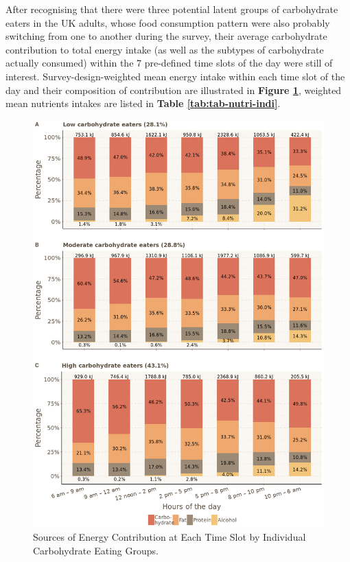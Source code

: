 After recognising that there were three potential latent groups of carbohydrate eaters in the UK adults, whose food consumption pattern were also probably switching from one to another during the survey, their average carbohydrate contribution to total energy intake (as well as the subtypes of carbohydrate actually consumed) within the 7 pre-defined time slots of the day were still of interest. Survey-design-weighted mean energy intake within each time slot of the day and their composition of contribution are illustrated in \textbf{Figure \ref{fig:energysourcesCB}}, weighted mean nutrients intakes are listed in \textbf{Table \ref{tab:tab-nutri-indi}}.

\begin{figure}[H]
	\centering
	\includegraphics[width=13cm]{Figures/CBenergysources.png}
	\decoRule
	\caption[Sources of Energy Contribution at Each Time Slot by Individual Carbohydrate Eating Groups.]{Sources of Energy Contribution at Each Time Slot by Individual Carbohydrate Eating Groups.}
	\label{fig:energysourcesCB}
\end{figure}
\vspace{-0.6cm}

